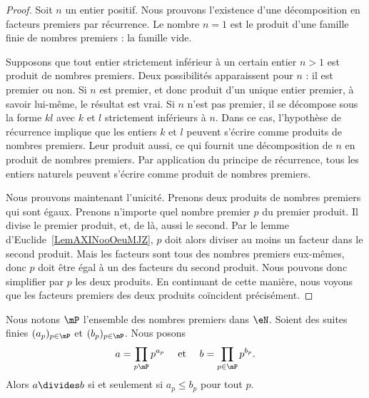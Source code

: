 \begin{proof}
    Soit \( n\) un entier positif. Nous prouvons l'existence d'une décomposition en facteurs premiers par récurrence. Le nombre \( n=1\) est le produit d'une famille finie de nombres premiers : la famille vide.

    Supposons que tout entier strictement inférieur à un certain entier \( n>1\) est produit de nombres premiers. Deux possibilités apparaissent pour $n$ : il est premier ou non. Si $n$ est premier, et donc produit d'un unique entier premier, à savoir lui-même, le résultat est vrai. Si \( n\) n'est pas premier, il se décompose sous la forme $kl$ avec $k$ et $l$ strictement inférieurs à $n$. Dans ce cas, l'hypothèse de récurrence implique que les entiers $k$ et $l$ peuvent s'écrire comme produits de nombres premiers. Leur produit aussi, ce qui fournit une décomposition de $n$ en produit de nombres premiers.  Par application du principe de récurrence, tous les entiers naturels peuvent s'écrire comme produit de nombres premiers.

    Nous prouvons maintenant l'unicité. Prenons deux produits de nombres premiers qui sont égaux. Prenons n'importe quel nombre premier $p$ du premier produit. Il divise le premier produit, et, de là, aussi le second. Par le lemme d'Euclide~\ref{LemAXINooOeuMJZ}, $p$ doit alors diviser au moins un facteur dans le second produit. Mais les facteurs sont tous des nombres premiers eux-mêmes, donc $p$ doit être égal à un des facteurs du second produit. Nous pouvons donc simplifier par $p$ les deux produits. En continuant de cette manière, nous voyons que les facteurs premiers des deux produits coïncident précisément.
\end{proof}

\begin{lemma}        \label{LEMooDTQQooYoJABt}
    Nous notons \( \mP\) l'ensemble des nombres premiers dans \( \eN\). Soient des suites finies \( (a_p)_{p\in \mP}\) et \( (b_p)_{p\in \mP}\). Nous posons
    \begin{equation}
        \begin{aligned}[]
            a&=\prod_{ p\mP}p^{a_p}&\text{ et }&&b=\prod_{ p\in \mP}p^{b_p}.
        \end{aligned}
    \end{equation}
    Alors \( a\divides b\) si et seulement si \( a_p\leq b_p\) pour tout \( p\).
\end{lemma}

